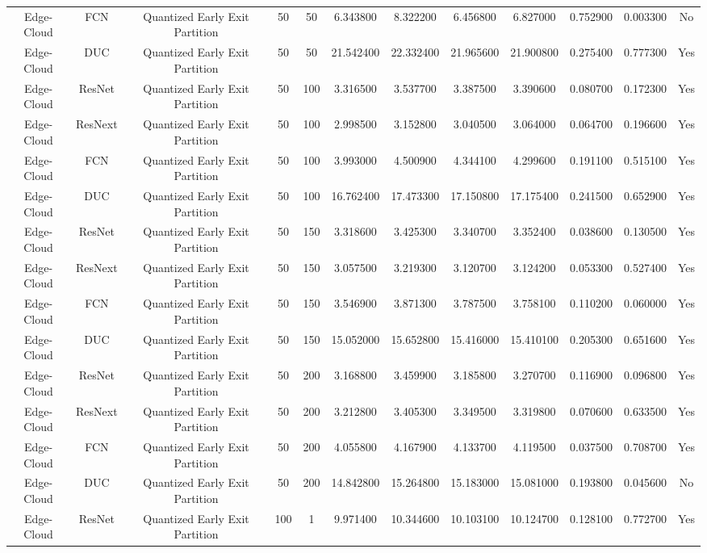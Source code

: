 \begin{tabular}{|c||c||c||c||c||c||c||c||c||c||c||c|}
Edge-Cloud & FCN & Quantized Early Exit Partition & 50 & 50 & 6.343800 & 8.322200 & 6.456800 & 6.827000 & 0.752900 & 0.003300 & No \\
Edge-Cloud & DUC & Quantized Early Exit Partition & 50 & 50 & 21.542400 & 22.332400 & 21.965600 & 21.900800 & 0.275400 & 0.777300 & Yes \\
Edge-Cloud & ResNet & Quantized Early Exit Partition & 50 & 100 & 3.316500 & 3.537700 & 3.387500 & 3.390600 & 0.080700 & 0.172300 & Yes \\
Edge-Cloud & ResNext & Quantized Early Exit Partition & 50 & 100 & 2.998500 & 3.152800 & 3.040500 & 3.064000 & 0.064700 & 0.196600 & Yes \\
Edge-Cloud & FCN & Quantized Early Exit Partition & 50 & 100 & 3.993000 & 4.500900 & 4.344100 & 4.299600 & 0.191100 & 0.515100 & Yes \\
Edge-Cloud & DUC & Quantized Early Exit Partition & 50 & 100 & 16.762400 & 17.473300 & 17.150800 & 17.175400 & 0.241500 & 0.652900 & Yes \\
Edge-Cloud & ResNet & Quantized Early Exit Partition & 50 & 150 & 3.318600 & 3.425300 & 3.340700 & 3.352400 & 0.038600 & 0.130500 & Yes \\
Edge-Cloud & ResNext & Quantized Early Exit Partition & 50 & 150 & 3.057500 & 3.219300 & 3.120700 & 3.124200 & 0.053300 & 0.527400 & Yes \\
Edge-Cloud & FCN & Quantized Early Exit Partition & 50 & 150 & 3.546900 & 3.871300 & 3.787500 & 3.758100 & 0.110200 & 0.060000 & Yes \\
Edge-Cloud & DUC & Quantized Early Exit Partition & 50 & 150 & 15.052000 & 15.652800 & 15.416000 & 15.410100 & 0.205300 & 0.651600 & Yes \\
Edge-Cloud & ResNet & Quantized Early Exit Partition & 50 & 200 & 3.168800 & 3.459900 & 3.185800 & 3.270700 & 0.116900 & 0.096800 & Yes \\
Edge-Cloud & ResNext & Quantized Early Exit Partition & 50 & 200 & 3.212800 & 3.405300 & 3.349500 & 3.319800 & 0.070600 & 0.633500 & Yes \\
Edge-Cloud & FCN & Quantized Early Exit Partition & 50 & 200 & 4.055800 & 4.167900 & 4.133700 & 4.119500 & 0.037500 & 0.708700 & Yes \\
Edge-Cloud & DUC & Quantized Early Exit Partition & 50 & 200 & 14.842800 & 15.264800 & 15.183000 & 15.081000 & 0.193800 & 0.045600 & No \\
Edge-Cloud & ResNet & Quantized Early Exit Partition & 100 & 1 & 9.971400 & 10.344600 & 10.103100 & 10.124700 & 0.128100 & 0.772700 & Yes \\

\end{tabular}
